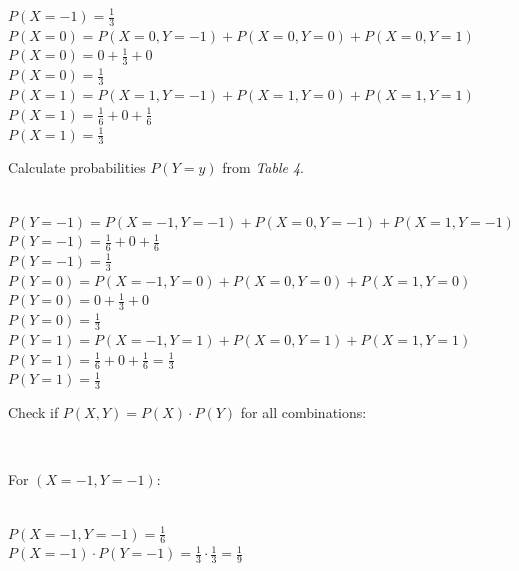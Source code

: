 \documentclass{article}
\begin{document}
$P(X = -1)= \frac{1}{3}$\\

$P(X = 0) = P(X = 0, Y = -1) + P(X = 0, Y = 0) + P(X = 0, Y = 1)$\\

$P(X = 0) = 0 + \frac{1}{3} + 0 $\\

$P(X = 0)= \frac{1}{3}$\\

$P(X = 1) = P(X = 1, Y = -1) + P(X = 1, Y = 0) + P(X = 1, Y = 1)$\\

$P(X = 1) = \frac{1}{6} + 0 + \frac{1}{6} $\\

$P(X = 1)= \frac{1}{3}$\\

\parbox{\textwidth}{Calculate probabilities $P(Y = y)$ from \textit{Table 4}.}\\

$P(Y = -1) = P(X = -1, Y = -1) + P(X = 0, Y = -1) + P(X = 1, Y = -1)$\\

$P(Y = -1) = \frac{1}{6} + 0 + \frac{1}{6} $\\

$P(Y = -1) = \frac{1}{3}$\\

$P(Y = 0) = P(X = -1, Y = 0) + P(X = 0, Y = 0) + P(X = 1, Y = 0)$\\

$P(Y = 0) = 0 + \frac{1}{3} + 0 $\\

$P(Y = 0) = \frac{1}{3}$\\

$P(Y = 1) = P(X = -1, Y = 1) + P(X = 0, Y = 1) + P(X = 1, Y = 1)$\\

$P(Y = 1) = \frac{1}{6} + 0 + \frac{1}{6} = \frac{1}{3}$\\

$P(Y = 1) = \frac{1}{3}$\\

\parbox{\textwidth}{Check if $P(X , Y) = P(X) \cdot P(Y)$ for all combinations:}\\

\parbox{\textwidth}{For $(X = -1, Y = -1)$:}\\

$P(X = -1, Y = -1) = \frac{1}{6}$\\

$P(X = -1) \cdot P(Y = -1) = \frac{1}{3} \cdot \frac{1}{3} = \frac{1}{9}$\\
\end{document}
